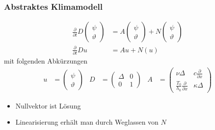 \begin{frame}
\frametitle{Abstraktes Klimamodell}
\begin{align*}
\frac{\partial}{\partial t}
D
\begin{pmatrix}\psi\\\vartheta\end{pmatrix}
&=
A
\begin{pmatrix}\psi\\\vartheta\end{pmatrix}
+
N
\begin{pmatrix}\psi\\\vartheta\end{pmatrix}
\\
\frac{\partial}{\partial t}Du&=Au+N(u)
\end{align*}
mit folgenden Abkürzungen
\begin{align*}
u
&=
\begin{pmatrix}
\psi\\\vartheta
\end{pmatrix}
&
D
&=
\begin{pmatrix}
\Delta&0\\0&1
\end{pmatrix}
&
A
&=
\begin{pmatrix}
\nu\Delta&c\frac{\partial}{\partial x}\\
\frac{T_0}{h_0}\frac{\partial}{\partial x}&\kappa\Delta
\end{pmatrix}
\end{align*}
\begin{itemize}
\item
Nullvektor ist Lösung
\item
Linearisierung erhält man durch Weglassen von $N$
\end{itemize}
\end{frame}


